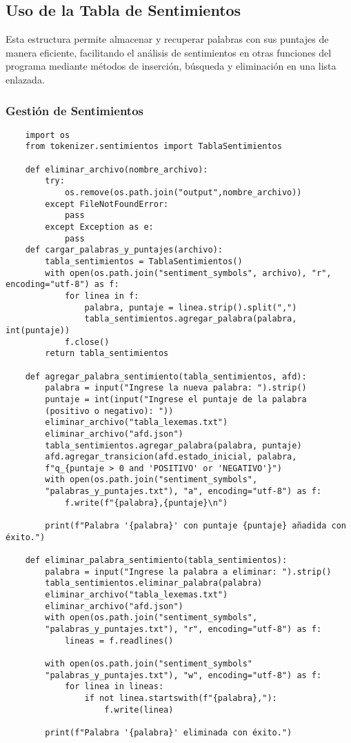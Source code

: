 \documentclass[12pt,a4paper]{scrartcl} %
\begin{document}
\subsection*{Uso de la Tabla de Sentimientos}
Esta estructura permite almacenar y recuperar palabras con sus puntajes de manera eficiente,
facilitando el análisis de sentimientos en otras funciones del programa mediante métodos de
inserción, búsqueda y eliminación en una lista enlazada.

\subsubsection{Gestión de Sentimientos}

\begin{verbatim}
    import os
    from tokenizer.sentimientos import TablaSentimientos
    
    def eliminar_archivo(nombre_archivo):
        try:
            os.remove(os.path.join("output",nombre_archivo))
        except FileNotFoundError:
            pass
        except Exception as e:
            pass
    def cargar_palabras_y_puntajes(archivo):
        tabla_sentimientos = TablaSentimientos()
        with open(os.path.join("sentiment_symbols", archivo), "r", encoding="utf-8") as f:
            for linea in f:
                palabra, puntaje = linea.strip().split(",")
                tabla_sentimientos.agregar_palabra(palabra, int(puntaje))
            f.close()    
        return tabla_sentimientos
    
    def agregar_palabra_sentimiento(tabla_sentimientos, afd):
        palabra = input("Ingrese la nueva palabra: ").strip()
        puntaje = int(input("Ingrese el puntaje de la palabra 
        (positivo o negativo): "))
        eliminar_archivo("tabla_lexemas.txt")
        eliminar_archivo("afd.json")    
        tabla_sentimientos.agregar_palabra(palabra, puntaje)        
        afd.agregar_transicion(afd.estado_inicial, palabra, 
        f"q_{puntaje > 0 and 'POSITIVO' or 'NEGATIVO'}")        
        with open(os.path.join("sentiment_symbols",
        "palabras_y_puntajes.txt"), "a", encoding="utf-8") as f:
            f.write(f"{palabra},{puntaje}\n")
        
        print(f"Palabra '{palabra}' con puntaje {puntaje} añadida con éxito.")
    
    def eliminar_palabra_sentimiento(tabla_sentimientos):
        palabra = input("Ingrese la palabra a eliminar: ").strip()
        tabla_sentimientos.eliminar_palabra(palabra)
        eliminar_archivo("tabla_lexemas.txt")
        eliminar_archivo("afd.json")
        with open(os.path.join("sentiment_symbols",
        "palabras_y_puntajes.txt"), "r", encoding="utf-8") as f:
            lineas = f.readlines()
        
        with open(os.path.join("sentiment_symbols"
        "palabras_y_puntajes.txt"), "w", encoding="utf-8") as f:
            for linea in lineas:
                if not linea.startswith(f"{palabra},"):
                    f.write(linea)
    
        print(f"Palabra '{palabra}' eliminada con éxito.")
        
\end{verbatim}
\end{document}
